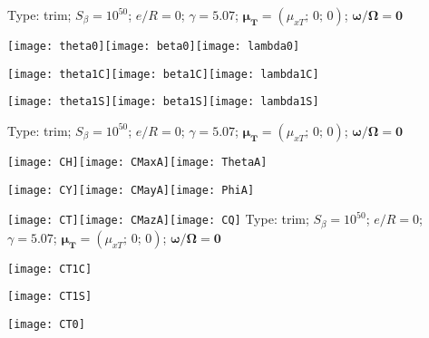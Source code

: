 \documentclass[a4paper]{article}
\renewcommand{\vec}[1]{\mathbf{#1}}
\begin{document}
\pagestyle{empty}

\begin{landscape}
\begin{center}
Type: trim; $S_{\beta}=10^{50}$; $e/R=0$; $\gamma=5.07$; $\vec{\mu_T} = (\mu_{xT}; \, 0;\, 0)$; $\vec{\omega/\Omega} = \vec{0}$

\texttt{[image: theta0]}\texttt{[image: beta0]}\texttt{[image: lambda0]}

\texttt{[image: theta1C]}\texttt{[image: beta1C]}\texttt{[image: lambda1C]}

\texttt{[image: theta1S]}\texttt{[image: beta1S]}\texttt{[image: lambda1S]}

\clearpage
Type: trim; $S_{\beta}=10^{50}$; $e/R=0$; $\gamma=5.07$; $\vec{\mu_T} = (\mu_{xT}; \, 0;\, 0)$; $\vec{\omega/\Omega} = \vec{0}$

\texttt{[image: CH]}\texttt{[image: CMaxA]}\texttt{[image: ThetaA]}

\texttt{[image: CY]}\texttt{[image: CMayA]}\texttt{[image: PhiA]}

\texttt{[image: CT]}\texttt{[image: CMazA]}\texttt{[image: CQ]}
\clearpage
Type: trim; $S_{\beta}=10^{50}$; $e/R=0$; $\gamma=5.07$; $\vec{\mu_T} = (\mu_{xT}; \, 0;\, 0)$; $\vec{\omega/\Omega} = \vec{0}$

\texttt{[image: CT1C]}

\texttt{[image: CT1S]}

\texttt{[image: CT0]}
\end{center}
\end{landscape}
\end{document}
